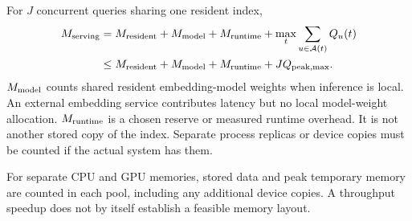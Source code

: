 For $J$ concurrent queries sharing one resident index,
\begin{equation}
\begin{aligned}
M_{\rm serving}&=M_{\rm resident}+M_{\rm model}+M_{\rm runtime}
                 +\max_t\sum_{u\in\mathcal A(t)}Q_u(t)\\
&\leq M_{\rm resident}+M_{\rm model}+M_{\rm runtime}+JQ_{\rm peak,max}.
\end{aligned}
\label{eq:serving}
\end{equation}
$M_{\rm model}$ counts shared resident embedding-model weights when inference is local. An external embedding service contributes latency but no local model-weight allocation. $M_{\rm runtime}$ is a chosen reserve or measured runtime overhead. It is not another stored
copy of the index. Separate process replicas or device copies must be counted if the actual
system has them.

For separate CPU and GPU memories, stored data and peak temporary memory are counted in each pool, including any additional device copies. A throughput speedup does not by itself establish a feasible memory layout.
